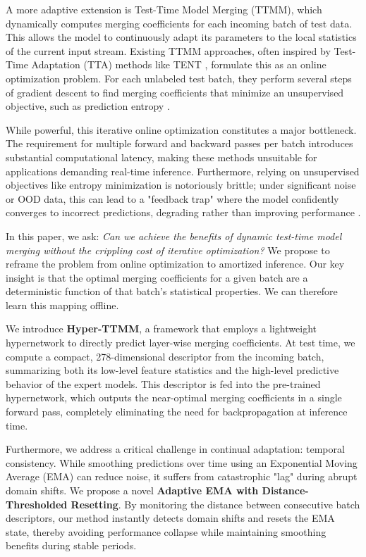 \documentclass{article}
\theoremstyle{plain}
\theoremstyle{definition}
\theoremstyle{remark}
\begin{document}
A more adaptive extension is Test-Time Model Merging (TTMM), which dynamically computes merging coefficients for each incoming batch of test data. This allows the model to continuously adapt its parameters to the local statistics of the current input stream. Existing TTMM approaches, often inspired by Test-Time Adaptation (TTA) methods like TENT \citep{wang2021tent}, formulate this as an online optimization problem. For each unlabeled test batch, they perform several steps of gradient descent to find merging coefficients that minimize an unsupervised objective, such as prediction entropy \citep{zhang2022memo, liang2023fully}.

While powerful, this iterative online optimization constitutes a major bottleneck. The requirement for multiple forward and backward passes per batch introduces substantial computational latency, making these methods unsuitable for applications demanding real-time inference. Furthermore, relying on unsupervised objectives like entropy minimization is notoriously brittle; under significant noise or OOD data, this can lead to a "feedback trap" where the model confidently converges to incorrect predictions, degrading rather than improving performance \citep{pmlr-v162-karim22a, sun2020test}.

In this paper, we ask: \textit{Can we achieve the benefits of dynamic test-time model merging without the crippling cost of iterative optimization?} We propose to reframe the problem from online optimization to amortized inference. Our key insight is that the optimal merging coefficients for a given batch are a deterministic function of that batch's statistical properties. We can therefore learn this mapping offline.

We introduce \textbf{Hyper-TTMM}, a framework that employs a lightweight hypernetwork \citep{ha2016hypernetworks} to directly predict layer-wise merging coefficients. At test time, we compute a compact, 278-dimensional descriptor from the incoming batch, summarizing both its low-level feature statistics and the high-level predictive behavior of the expert models. This descriptor is fed into the pre-trained hypernetwork, which outputs the near-optimal merging coefficients in a single forward pass, completely eliminating the need for backpropagation at inference time.

Furthermore, we address a critical challenge in continual adaptation: temporal consistency. While smoothing predictions over time using an Exponential Moving Average (EMA) can reduce noise, it suffers from catastrophic "lag" during abrupt domain shifts. We propose a novel \textbf{Adaptive EMA with Distance-Thresholded Resetting}. By monitoring the distance between consecutive batch descriptors, our method instantly detects domain shifts and resets the EMA state, thereby avoiding performance collapse while maintaining smoothing benefits during stable periods.
\end{document}
